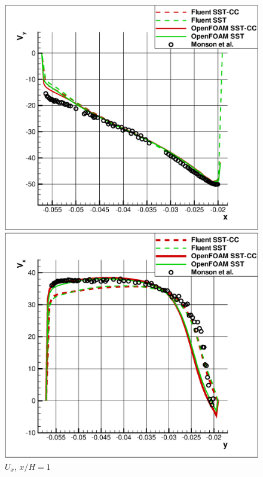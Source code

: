 \documentclass[a4paper]{jpconf}
\begin{document}
\begin{figure}[ht]
	\vspace{-1em}
	\begin{minipage}{0.45\linewidth}
		\includegraphics[scale=0.33]{yh0}
		\caption{$U_y$, $y/H=0$}
		\label{fig:x1up}
	\end{minipage}
	\hspace{0.5em}
	\begin{minipage}{0.45\linewidth}
		\includegraphics[scale=0.33]{xh1down}
		\caption{$U_x$, $x/H=1$}
		\label{fig:x1down}
	\end{minipage}
\end{figure}
\end{document}
